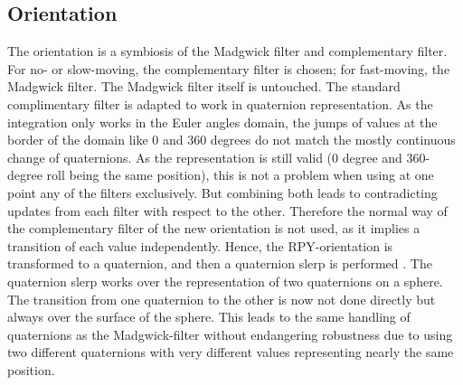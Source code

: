 \documentclass[letterpaper, 10 pt, conference]{ieeeconf}  %
\begin{document}
\subsection{Orientation}
The orientation is a symbiosis of the Madgwick filter and complementary filter. For no- or slow-moving, the complementary filter is chosen; for fast-moving, the Madgwick filter. The Madgwick filter itself is untouched.
The standard complimentary filter is adapted to work in quaternion representation.
 As the integration only works in the Euler angles domain, the jumps of values at the border of the domain like 0 and 360 degrees do not match the mostly continuous change of quaternions.
As the representation is still valid (0 degree and 360-degree roll being the same position), this is not a problem when using at one point any of the filters exclusively.
 But combining both leads to contradicting updates from each filter with respect to the other.
 Therefore the normal way of the complementary filter of the new orientation is 
not used, as it implies a transition of each value independently.
Hence, the RPY-orientation is transformed to a quaternion, and then a quaternion slerp is performed \cite{dam1998quaternions}.
 The quaternion slerp works over the representation of two quaternions on a sphere. The transition from one quaternion to the other is now not done directly but always over the surface of the sphere.
 This leads to the same handling of quaternions as the Madgwick-filter without endangering robustness due to using two different quaternions with very different values representing nearly the same position.
 
\end{document}
